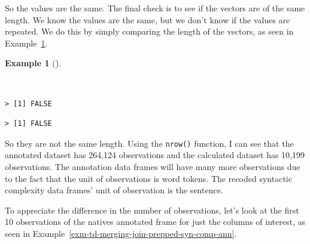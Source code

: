 \documentclass[
  letterpaper,
  DIV=11,
  numbers=noendperiod]{scrreprt}
\newenvironment{Shaded}{\begin{snugshade}}{\end{snugshade}}
\newcommand{\CommentTok}[1]{\textcolor[rgb]{0.00,0.00,0.00}{\textit{#1}}}
\newcommand{\FunctionTok}[1]{\textcolor[rgb]{0.00,0.00,0.00}{#1}}
\newcommand{\NormalTok}[1]{\textcolor[rgb]{0.00,0.00,0.00}{#1}}
\newcommand{\SpecialCharTok}[1]{\textcolor[rgb]{0.00,0.00,0.00}{#1}}
\theoremstyle{definition}
\newtheorem{example}{Example}[chapter]
\theoremstyle{remark}
\begin{document}
So the values are the same. The final check is to see if the vectors are
of the same length. We know the values are the same, but we don't know
if the values are repeated. We do this by simply comparing the length of
the vectors, as seen in
Example~\ref{exm-td-merging-join-prepped-syn-comp-length}.

\begin{example}[]\protect\hypertarget{exm-td-merging-join-prepped-syn-comp-length}{}\label{exm-td-merging-join-prepped-syn-comp-length}

~

\begin{Shaded}
\end{Shaded}

\begin{verbatim}
> [1] FALSE
\end{verbatim}

\begin{Shaded}
\end{Shaded}

\begin{verbatim}
> [1] FALSE
\end{verbatim}

\end{example}

So they are not the same length. Using the \texttt{nrow()} function, I
can see that the annotated dataset has 264,124 observations and the
calculated dataset has 10,199 observations. The annotation data frames
will have many more observations due to the fact that the unit of
observations is word tokens. The recoded syntactic complexity data
frames' unit of observation is the sentence.

To appreciate the difference in the number of observations, let's look
at the first 10 observations of the natives annotated frame for just the
columns of interest, as seen in
Example~\ref{exm-td-merging-join-prepped-syn-comp-ann}.
\end{document}

